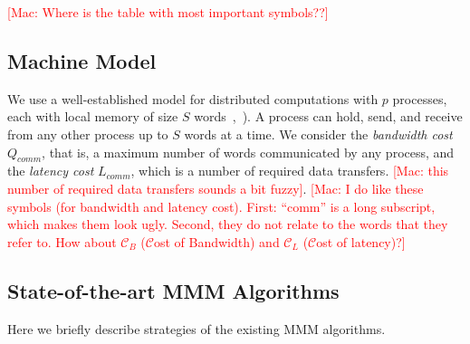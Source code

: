 \documentclass[sigplan,review,anonymous]{acmart}\settopmatter{printfolios=true,printccs=false,printacmref=false}
\newcommand\mac[1]{\textcolor{red}{[Mac: #1]}}
\begin{document}
\mac{Where is the table with most important symbols??}

\subsection{Machine Model}

We use a well-established model for distributed computations with $p$
processes, each with local memory of size $S$ words~\cite{CARMA},~\cite{25d}).
A process can hold, send, and receive from any other process up to $S$ words at 
a time. We consider the \emph{bandwidth cost} $Q_{comm}$, that is, a 
maximum number of
words communicated by any process, and the \emph{latency cost} $L_{comm}$, 
which is a number of
required data transfers. \mac{this number of required data transfers sounds a
bit fuzzy}.  \mac{I do like these symbols (for bandwidth and latency cost).
First: ``comm'' is a long subscript, which makes them look ugly. Second, they
do not relate to the words that they refer to. How about $\mathcal{C}_{B}$
  ($\mathcal{C}$ost of Bandwidth) and $\mathcal{C}_L$ ($\mathcal{C}$ost of
  latency)?}


\subsection{State-of-the-art MMM Algorithms}

Here we briefly describe strategies of the existing MMM algorithms.
\end{document}
